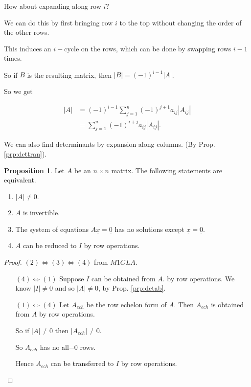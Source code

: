 \documentclass{article}
\theoremstyle{definition} \newtheorem*{definition}{Definition}
\newtheorem{proposition}[theorem]{Proposition}
\begin{document}
   How about expanding along row $i$?

   We can do this by first bringing row $i$ to the top without changing the
   order of the other rows.

   This induces an $i-$cycle on the rows, which can be done by swapping
   rows $i-1$ times.

   So if $B$ is the resulting matrix, then $|B|=(-1)^{i-1}|A|$.

   So we get

   \begin{align*}
     |A| &= (-1)^{i-1} \sum_{j=1}^n (-1)^{j+1} a_{ij} |A_{ij}| \\
     &= \sum_{j=1}^n (-1)^{i+j} a_{ij} |A_{ij}|.
   \end{align*}

   \begin{remark}
     We can also find determinants by expansion along columns. (By Prop. \ref{prp:dettran}).
   \end{remark}
  
   \begin{proposition}
     Let $A$ be an $n\times n$ matrix.
     The following statements are equivalent. 
     \begin{enumerate}
       \item $|A| \neq 0$.
       \item $A$ is invertible.
       \item The system of equations $A\underline{x}=\underline{0}$ has no 
         solutions except $\underline{x}=\underline{0}$.
       \item $A$ can be reduced to $I$ by row operations.
     \end{enumerate}
   \end{proposition}

   \begin{proof}
     $(2) \iff (3) \iff (4)$ from $M1GLA$.
     \begin{itemize}
       \item[$(4) \iff (1)$] Suppose $I$ can be obtained from $A$. by row
         operations. We know $|I|\neq 0$ and so $|A|\neq 0$, by Prop.
         \ref{prp:detab}.

       \item[$(1)\iff (4)$] Let $A_{ech}$ be the row echelon form of $A$.
         Then $A_{ech}$ is obtained from $A$ by row operations.

         So if $|A|\neq 0$ then $|A_{ech}| \neq 0$.

         So $A_{ech}$ has no all$-0$ rows.

         Hence $A_{ech}$ can be transferred to $I$ by row operations.
     \end{itemize}
   \end{proof}
\end{document}
